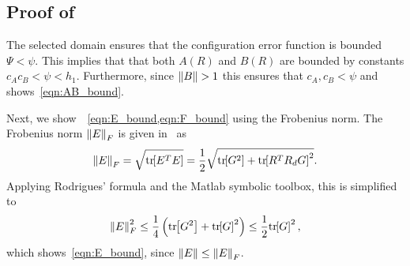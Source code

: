 \documentclass[fleqn]{IJCAS}  %
\begin{document}
\begin{multicols}{2}
\subsection{Proof of~}\label{proof:eR_dot_bound}
The selected domain ensures that the configuration error function is bounded \( \Psi < \psi \).
This implies that that both \( A(R) \) and \( B(R) \) are bounded by constants \( c_A c_B < \psi < h_1\).
Furthermore, since \( \left\| B \right\| > 1 \) this ensures that \( c_A, c_B < \psi\) and shows~\cref{eqn:AB_bound}.

Next, we show~~\cref{eqn:E_bound,eqn:F_bound} using the Frobenius norm.
The Frobenius norm \( \left\| E \right\|_F \) is given in~\cite{LeeITCST13} as
\begin{gather*}
	\left\| E \right\|_F = \sqrt{\mathrm{tr}\negthickspace\left[ E^T E \right]} = \frac{1}{2} \sqrt{\mathrm{tr}\negthickspace\left[ G^2 \right] + \mathrm{tr}\negthickspace\left[ R^T R_d G \right]^2} .
\end{gather*}
Applying Rodrigues' formula and the Matlab symbolic toolbox, this is simplified to
\begin{gather*}
	\left\| E \right\|^2_F \leq \frac{1}{4} \left( \mathrm{tr}\negthickspace\left[ G^2 \right] + \mathrm{tr}\negthickspace\left[ G \right]^2 \right) \leq \frac{1}{2} \mathrm{tr}\negthickspace\left[ G \right]^2 ,
\end{gather*}
which shows~\cref{eqn:E_bound}, since \( \left\| E \right\| \leq \left\| E \right\|_F \).


\end{multicols}
\end{document}
